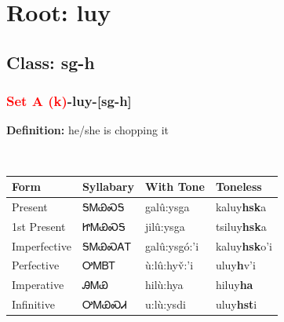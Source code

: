 \needspace{4in}
\section*{Root: luy}
\nopagebreak
{}
\needspace{3in}
\subsection*{Class: sg-h}
\nopagebreak
\needspace{2in}
\subsubsection*{\textcolor{Red}{Set A (k)}{-}\textbf{luy}{-}[sg-h]}
\nopagebreak
\textbf{Definition: } he/she is chopping it
\\[0.5em]
\begin{tabularx}{\textwidth}{l X X X}%
\toprule%
\textbf{Form}&\textbf{Syllabary}&\textbf{With Tone}&\textbf{Toneless}\\%
\midrule%
Present&ᎦᎷᏯᏍᎦ&galû:ysga&kaluy\textbf{hsk}a\\%
1st Present&ᏥᎷᏯᏍᎦ&jilû:ysga&tsiluy\textbf{hsk}a\\%
Imperfective&ᎦᎷᏯᏍᎪᎢ&galû:ysgó:’i&kaluy\textbf{hsk}o'i\\%
Perfective&ᎤᎷᏴᎢ&ù:lû:hyv̌:’i&uluy\textbf{h}v'i\\%
Imperative&ᎯᎷᏯ&hilù:hya&hiluy\textbf{ha}\\%
Infinitive&ᎤᎷᏯᏍᏗ&u:lù:ysdi&uluy\textbf{hst}i\\%
\bottomrule%
\end{tabularx}
\\[1em]